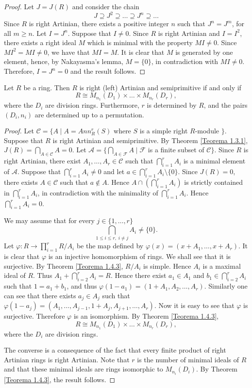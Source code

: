 \begin{proof}
Let $J=J(R)$ and consider the chain
$$J\supseteq J^2\supseteq\dots\supseteq J^n\supseteq\dots$$
Since $R$ is right Artinian, there exists a positive integer $n$
such that $J^n=J^m$, for all $m\geq n$. Let $I=J^n$. Suppose that
$I\neq 0$. Since $R$ is right Artinian and $I=I^2$, there exists a right ideal $M$ which is minimal with the property
$MI\neq 0$. Since $MI^2=MI\neq 0$,
we have that $MI=M$. It is clear that $M$ is generated by one element, hence, by Nakayasma's lemma, $M=\{0\}$, in contradiction with $MI\neq 0$. Therefore,
$I=J^n=0$ and the result follows.
\end{proof}

\begin{theorem}
Let $R$ be a ring. Then $R$ is right (left) Artinian and semiprimitive if and only if
$$R\cong M_{n_1}(D_1)\times \dots\times M_{n_r}(D_r),$$
where the $D_i$ are division rings. Furthermore, $r$ is determined by $R$, and the pairs $(D_i,n_i)$ are determined up to a permutation.
\end{theorem}

\begin{proof}
Let $\mathcal{C}=\{ A\mid A=Ann^r_R(S)$ where $S$ is a simple right $R$-module $\}$. Suppose that $R$ is right Artinian and semiprimitive.
By Theorem \ref{Teorema 1.3.1}, $J(R)=\bigcap_{A\in\mathcal{C}}A=0$. Let $\mathcal{A}=\{\bigcap_{A\in \mathcal{F}}A \mid \mathcal{F}$ is a finite subset of $\mathcal{C}\}$. Since $R$ is right Artinian, there exist $A_1,\dots,A_r\in \mathcal{C}$ such that
$\bigcap_{i=1}^rA_i$ is a minimal element of $\mathcal{A}$. Suppose that
$\bigcap_{i=1}^rA_i\neq 0$ and let $a\in\bigcap_{i=1}^rA_i\setminus\{ 0\}$.
Since $J(R)=0$, there exists $A\in \mathcal{C}$ such that $a\notin A$. Hence $A\cap (\bigcap_{i=1}^rA_i)$ is strictly contained in $\bigcap_{i=1}^rA_i$, in contradiction with the minimality of $\bigcap_{i=1}^rA_i$. Hence $\bigcap_{i=1}^rA_i=0$.

We may assume that for every $j\in\{ 1,\dots ,r\}$  
$$\bigcap_{1\leq i\leq r,\;
i\neq j}A_i\neq \{0\}.$$
Let $\varphi\colon R\rightarrow \prod_{i=1}^rR/A_i$ be the map defined by
$\varphi(x)=(x+A_1,\dots,x+A_r)$. It is clear that $\varphi$ is an injective homomorphism of rings. We shall see that it is surjective. By Theorem \ref{Teorema 1.4.3},
$R/A_i$ is simple. Hence $A_i$ is a maximal ideal of $R$. Thus
$A_1+\bigcap_{i=2}^rA_i=R$. Hence there exist $a_1\in A_1$ and
$b_1\in\bigcap_{i=2}^rA_i$ such that $1=a_1+b_1$, and thus $\varphi
(1-a_1)=(1+A_1,A_2,\dots ,A_r)$. Similarly one can see that there exists $a_j\in A_j$ such that
$\varphi(1-a_j)=(A_1,\dots ,A_{j-1},1+A_j,A_{j+1},\dots, A_r)$. Now it is easy to see that $\varphi$ is surjective.
Therefore $\varphi$ is an isomorphism. By Theorem \ref{Teorema 1.4.3},
$$R\cong M_{n_1}(D_1)\times\dots\times M_{n_r}(D_r),$$
where the $D_i$ are division rings.

The converse is a consequence of the fact that every finite product of right Artinian rings is right Artinian. 
Note that  $r$ is the number of minimal ideals of $R$ and that these minimal ideals are rings isomorphic to $M_{n_i}(D_i)$.
By Theorem \ref{Teorema 1.4.3}, the result follows.
\end{proof}

